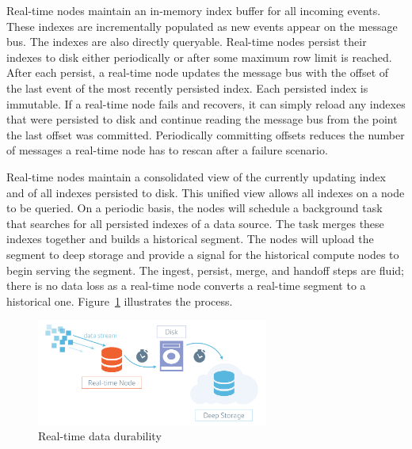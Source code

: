 \documentclass{vldb}
\begin{document}
Real-time nodes maintain an in-memory index buffer for all incoming
events. These indexes are incrementally populated as new events appear on the message bus. The indexes are also directly queryable.
Real-time nodes persist their indexes to disk either periodically or after some maximum row limit is
reached. After each persist, a real-time node updates the message bus
with the offset of the last event of the most recently persisted
index. Each persisted index is immutable. If a real-time node fails and recovers, it can simply reload
any indexes that were persisted to disk and continue reading the
message bus from the point the last offset was committed. Periodically committing offsets reduces the number of messages a real-time
node has to rescan after a failure scenario.

Real-time nodes maintain a consolidated view of the currently updating
index and of all indexes persisted to disk. This unified view allows
all indexes on a node to be queried. On a periodic basis, the nodes will
schedule a background task that searches for all persisted indexes of
a data source. The task merges these indexes together and builds a
historical segment. The nodes will upload the segment to deep storage
and provide a signal for the historical compute nodes to begin serving
the segment. The ingest, persist, merge, and handoff steps are fluid;
there is no data loss as a real-time node converts a real-time segment
to a historical one. Figure~\ref{fig:data-durability} illustrates the process.

\begin{figure}
\centering
\includegraphics[width = 3in]{druid_realtime_flow}
\caption{Real-time data durability}
\label{fig:data-durability}
\end{figure}
\end{document}

